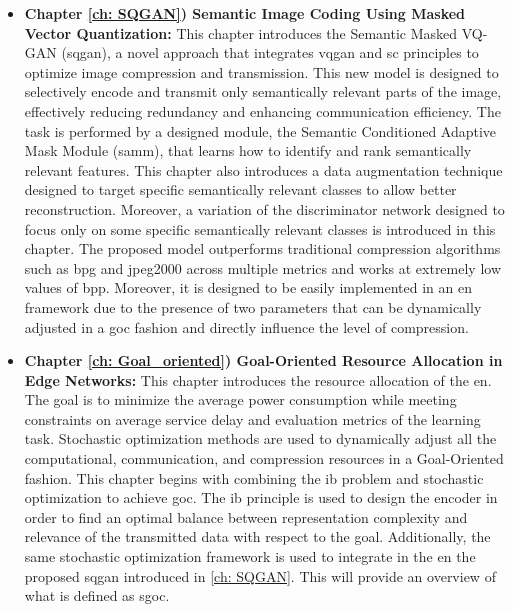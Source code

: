 \begin{itemize}[label={}]
    \item {\textbf{Chapter \ref{ch: SQGAN}) Semantic Image Coding Using
Masked Vector Quantization:}} This chapter introduces the Semantic Masked VQ-GAN (\acrshort{sqgan}), a novel approach that integrates \gls{vqgan} and \gls{sc} principles to optimize image compression and transmission. This new model is designed to selectively encode and transmit only semantically relevant parts of the image, effectively reducing redundancy and enhancing communication efficiency. The task is performed by a designed module, the Semantic Conditioned Adaptive Mask Module (\acrshort{samm}), that learns how to identify and rank semantically relevant features. This chapter also introduces a data augmentation technique designed to target specific semantically relevant classes to allow better reconstruction. Moreover, a variation of the discriminator network designed to focus only on some specific semantically relevant classes is introduced in this chapter.
    The proposed model outperforms traditional compression algorithms such as \gls{bpg} and \gls{jpeg2000} across multiple metrics and works at extremely low values of \gls{bpp}. Moreover, it is designed to be easily implemented in an \gls{en} framework due to the presence of two parameters that can be dynamically adjusted in a \gls{goc} fashion and directly influence the level of compression.
    \item {\textbf{Chapter \ref{ch: Goal_oriented}) Goal-Oriented Resource Allocation in Edge Networks:}} This chapter introduces the resource allocation of the \gls{en}. The goal is to minimize the average power consumption while meeting constraints on average service delay and evaluation metrics of the learning task. Stochastic optimization methods are used to dynamically adjust all the computational, communication, and compression resources in a Goal-Oriented fashion. This chapter begins with combining the \gls{ib} problem and stochastic optimization to achieve \gls{goc}. The \gls{ib} principle is used to design the encoder in order to find an optimal balance between representation complexity and relevance of the transmitted data with respect to the goal. Additionally, the same stochastic optimization framework is used to integrate in the \gls{en} the proposed \acrshort{sqgan} introduced in \cref{ch: SQGAN}. This will provide an overview of what is defined as \gls{sgoc}.
\end{itemize}

